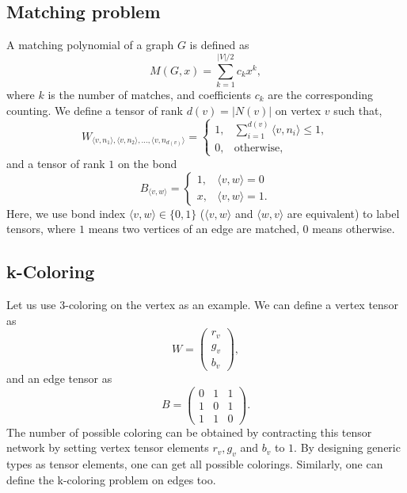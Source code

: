 \documentclass[onefignum, onetabnum]{siamart190516}
\newcommand{\<}{\langle}
\renewcommand{\>}{\rangle}
\newcounter{example}
\begin{document}
\subsection{Matching problem}
A matching polynomial of a graph $G$ is defined as
\begin{equation}
    M(G, x) = \sum\limits_{k=1}^{|V|/2} c_k x^k,
\end{equation}
where $k$ is the number of matches, and coefficients $c_k$ are the corresponding counting.
We define a tensor of rank $d(v) = |N(v)|$ on vertex $v$ such that,
\begin{equation}
    W_{\langle v, n_1\rangle, \langle v, n_2 \rangle, \ldots, \langle v, n_{d(v)}\rangle} = \begin{cases}
        1, & \sum_{i=1}^{d(v)} \langle v, n_i \rangle \leq 1,\\
        0, & \text{otherwise},
    \end{cases}
\end{equation}
and a tensor of rank $1$ on the bond
\begin{equation}
    B_{\langle v, w\rangle} = \begin{cases}
    1, & \langle v, w \rangle = 0 \\
    x, & \langle v, w \rangle = 1.
\end{cases}
\end{equation}
Here, we use bond index $\langle v, w \rangle \in \{0, 1\}$ ($\langle v, w \rangle$ and $\langle w,v\rangle$ are equivalent) to label tensors,
where $1$ means two vertices of an edge are matched, $0$ means otherwise.

\subsection{k-Coloring}
Let us use 3-coloring on the vertex as an example. We can define a vertex tensor as
\begin{equation}
    W = \left(\begin{matrix}
        r_v\\
        g_v\\
        b_v
    \end{matrix}\right),
\end{equation}
and an edge tensor as
\begin{equation}
    B = \left(\begin{matrix}
        0 & 1 & 1\\
        1 & 0 & 1\\
        1 & 1 & 0
    \end{matrix}\right).
\end{equation}
The number of possible coloring can be obtained by contracting this tensor network by setting vertex tensor elements $r_v, g_v$ and $b_v$ to $1$.
By designing generic types as tensor elements, one can get all possible colorings.
Similarly, one can define the k-coloring problem on edges too.
\end{document}
